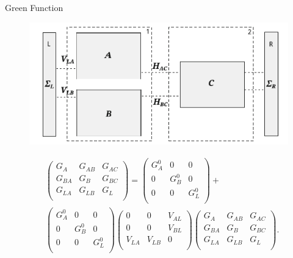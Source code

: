 \documentclass[handout,t]{beamer}
\begin{document}
\begin{frame}{Green Function}
	\begin{figure}
		\centering
		\includegraphics[width=0.7\linewidth]{../figures/multiconnectedgreen.png}
		\label{fig:multiconnectedgreen}
	\end{figure}
	\begin{equation}
		\begin{aligned}
			  & \left( \begin{matrix}
			   {{G}_{A}} & {{G}_{AB}} & {{G}_{AC}}  \\
			   {{G}_{BA}} & {{G}_{B}} & {{G}_{BC}}  \\
			   {{G}_{LA}} & {{G}_{LB}} & {{G}_{L}}  \\
			\end{matrix} \right)=\left( \begin{matrix}
			   G_{A}^{0} & 0 & 0  \\
			   0 & G_{B}^{0} & 0  \\
			   0 & 0 & G_{L}^{0}  \\
			\end{matrix} \right)+ \\ 
			 & \left( \begin{matrix}
			   G_{A}^{0} & 0 & 0  \\
			   0 & G_{B}^{0} & 0  \\
			   0 & 0 & G_{L}^{0}  \\
			\end{matrix} \right)\left( \begin{matrix}
			   0 & 0 & {{V}_{AL}}  \\
			   0 & 0 & {{V}_{BL}}  \\
			   {{V}_{LA}} & {{V}_{LB}} & 0  \\
			\end{matrix} \right)\left( \begin{matrix}
			   {{G}_{A}} & {{G}_{AB}} & {{G}_{AC}}  \\
			   {{G}_{BA}} & {{G}_{B}} & {{G}_{BC}}  \\
			   {{G}_{LA}} & {{G}_{LB}} & {{G}_{L}}  \\
			\end{matrix} \right). \\ 
		\end{aligned}
		\label{eq:expandmultigrren}
	\end{equation}
\end{frame}
\end{document}
